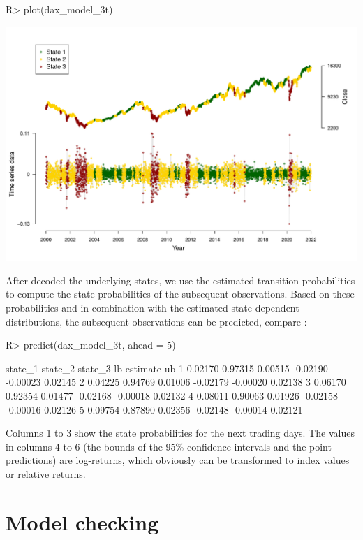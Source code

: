 \documentclass[article,shortnames]{jss}
\begin{document}
%
\begin{Schunk}
\begin{Sinput}
R> plot(dax_model_3t)
\end{Sinput}
\end{Schunk}
\includegraphics{fhmm_oelschlaeger_adam_michels-dax-dec-ts}
%

After decoded the underlying states, we use the estimated transition probabilities to compute the state probabilities of the subsequent observations. Based on these probabilities and in combination with the estimated state-dependent distributions, the subsequent observations can be predicted, compare \cite{zuc16}:

%
\begin{Schunk}
\begin{Sinput}
R> predict(dax_model_3t, ahead = 5)
\end{Sinput}
\begin{Soutput}
  state_1 state_2 state_3       lb estimate      ub
1 0.02170 0.97315 0.00515 -0.02190 -0.00023 0.02145
2 0.04225 0.94769 0.01006 -0.02179 -0.00020 0.02138
3 0.06170 0.92354 0.01477 -0.02168 -0.00018 0.02132
4 0.08011 0.90063 0.01926 -0.02158 -0.00016 0.02126
5 0.09754 0.87890 0.02356 -0.02148 -0.00014 0.02121
\end{Soutput}
\end{Schunk}
%

Columns 1 to 3 show the state probabilities for the next  trading days. The values in columns 4 to 6 (the bounds of the 95\%-confidence intervals and the point predictions) are log-returns, which obviously can be transformed to index values or relative returns.

\section{Model checking} \label{sec:model_checking} %
\end{document}
